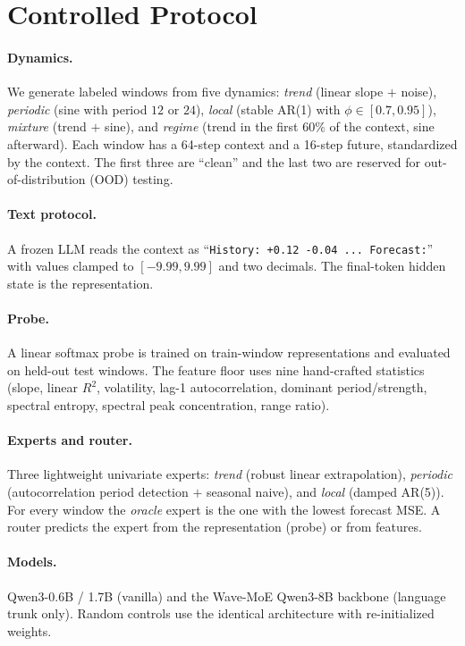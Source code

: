 \documentclass{article}
\begin{document}
\section{Controlled Protocol}\label{sec:protocol}

\paragraph{Dynamics.}  We generate labeled windows from five dynamics:
\emph{trend} (linear slope $+$ noise), \emph{periodic} (sine with period
$12$ or $24$), \emph{local} (stable AR(1) with $\phi\in[0.7,0.95]$),
\emph{mixture} (trend $+$ sine), and \emph{regime} (trend in the first $60\%$
of the context, sine afterward).  Each window has a 64-step context and a
16-step future, standardized by the context.  The first three are ``clean''
and the last two are reserved for out-of-distribution (OOD) testing.

\paragraph{Text protocol.}  A frozen LLM reads the context as
``\texttt{History: +0.12 -0.04 ... Forecast:}'' with values clamped to
$[-9.99,9.99]$ and two decimals.  The final-token hidden state is the
representation.

\paragraph{Probe.}  A linear softmax probe is trained on train-window
representations and evaluated on held-out test windows.  The feature floor uses
nine hand-crafted statistics (slope, linear $R^2$, volatility, lag-1
autocorrelation, dominant period/strength, spectral entropy, spectral peak
concentration, range ratio).

\paragraph{Experts and router.}  Three lightweight univariate experts:
\emph{trend} (robust linear extrapolation), \emph{periodic} (autocorrelation
period detection $+$ seasonal naive), and \emph{local} (damped AR(5)).  For
every window the \emph{oracle} expert is the one with the lowest forecast MSE.
A router predicts the expert from the representation (probe) or from features.

\paragraph{Models.}  Qwen3-0.6B / 1.7B (vanilla) and the Wave-MoE Qwen3-8B
backbone (language trunk only).  Random controls use the identical
architecture with re-initialized weights.
\end{document}
